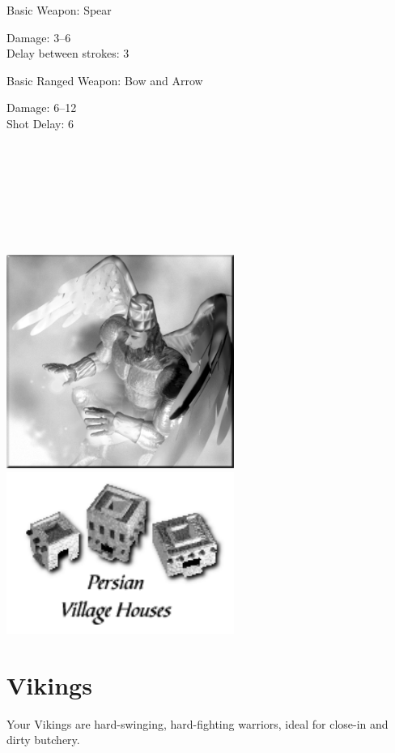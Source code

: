 Basic Weapon: Spear
\begin{adjustwidth}{1cm}{}
	Damage: 3–6 \\
	Delay between strokes: 3
\end{adjustwidth}
Basic Ranged Weapon: Bow and Arrow
\begin{adjustwidth}{1cm}{}
	Damage: 6–12 \\
	Shot Delay: 6 \\ \\ \\ \\ \\ \\ \\ \\ 
\end{adjustwidth}

\begin{center}
	\includegraphics[width=74.25mm]{Ahealinglord}\includegraphics[width=74.25mm]{Ipersianhouse}
\end{center}

\clearpage

\section{Vikings}

Your Vikings are hard-swinging, hard-fighting warriors, ideal for close-in and dirty butchery.

